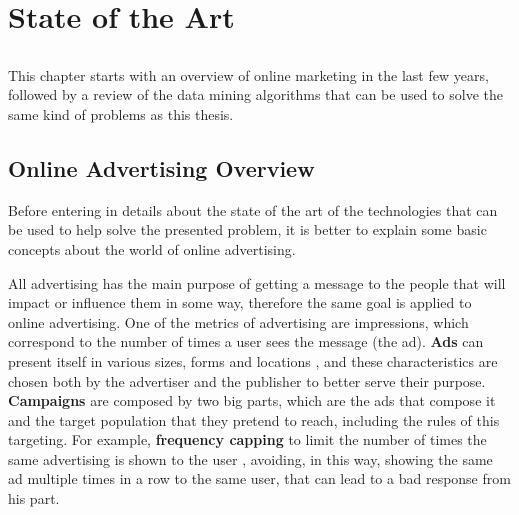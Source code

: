 \chapter{State of the Art} \label{chap:sota}

\section*{}

This chapter starts with an overview of online marketing in the last few years, followed by a review of the data mining algorithms that can be used to solve the same kind of problems as this thesis.

\section{Online Advertising Overview}

Before entering in details about the state of the art of the technologies that can be used to
help solve the presented problem, it is better to explain some basic concepts about the world of online advertising.

All advertising has the main purpose of getting a message to the people that will impact or influence them in some way,
therefore the same goal is applied to online advertising.
One of the metrics of advertising are impressions, which correspond to the number of times a user sees the message (the ad).\cite{kOA}
\textbf{Ads} can present itself in various sizes\cite{kOA2}, forms and locations \cite{kOA3}, and these characteristics are chosen both by the advertiser
and the publisher to better serve their purpose.
\textbf{Campaigns} are composed by two big parts, which are the ads that compose it and the target population that they pretend to reach,
including the rules of this targeting. For example, \textbf{frequency capping} to limit the number of times the same advertising is shown to the user \cite{kOA},
avoiding, in this way, showing the same ad multiple times in a row to the same user, that can lead to a bad response from his part.\cite{Buchbinder20141}

